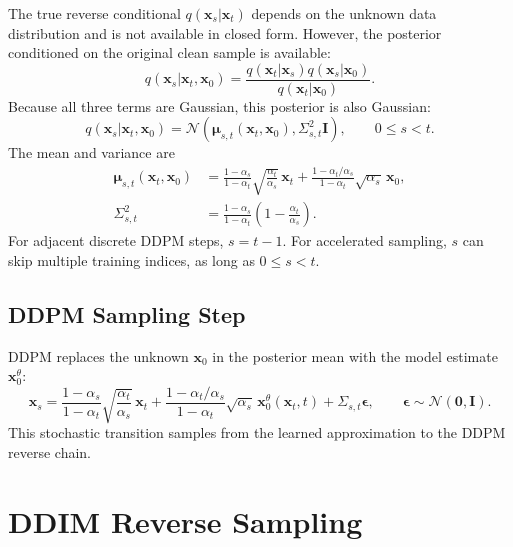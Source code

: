 \documentclass[11pt]{article}
\newcommand{\bx}{\mathbf{x}}
\newcommand{\beps}{\boldsymbol{\epsilon}}
\newcommand{\bI}{\mathbf{I}}
\newcommand{\N}{\mathcal{N}}
\begin{document}
The true reverse conditional $q(\bx_s|\bx_t)$ depends on the unknown data distribution and is not
available in closed form.  However, the posterior conditioned on the original clean sample is available:
\begin{equation}
  q(\bx_s|\bx_t,\bx_0)
  =
  \frac{q(\bx_t|\bx_s)q(\bx_s|\bx_0)}{q(\bx_t|\bx_0)}.
  \label{eq:bayes_posterior}
\end{equation}
Because all three terms are Gaussian, this posterior is also Gaussian:
\begin{equation}
  q(\bx_s|\bx_t,\bx_0)
  =
  \N\!\left(\boldsymbol{\mu}_{s,t}(\bx_t,\bx_0), \Sigma_{s,t}^2\bI\right),
  \qquad 0\leq s<t.
  \label{eq:posterior_gaussian}
\end{equation}
The mean and variance are
\begin{align}
  \boldsymbol{\mu}_{s,t}(\bx_t,\bx_0)
  &=
  \frac{1-\alpha_s}{1-\alpha_t}\sqrt{\frac{\alpha_t}{\alpha_s}}\,\bx_t
  +
  \frac{1-\alpha_t/\alpha_s}{1-\alpha_t}\sqrt{\alpha_s}\,\bx_0,
  \label{eq:posterior_mean} \\
  \Sigma_{s,t}^2
  &=
  \frac{1-\alpha_s}{1-\alpha_t}
  \left(1-\frac{\alpha_t}{\alpha_s}\right).
  \label{eq:posterior_variance}
\end{align}
For adjacent discrete DDPM steps, $s=t-1$.  For accelerated sampling, $s$ can skip multiple training
indices, as long as $0\leq s<t$.

\subsection{DDPM Sampling Step}

DDPM replaces the unknown $\bx_0$ in the posterior mean with the model estimate $\bx_0^\theta$:
\begin{equation}
  \bx_s
  =
  \frac{1-\alpha_s}{1-\alpha_t}\sqrt{\frac{\alpha_t}{\alpha_s}}\,\bx_t
  +
  \frac{1-\alpha_t/\alpha_s}{1-\alpha_t}\sqrt{\alpha_s}\,\bx_0^\theta(\bx_t,t)
  +
  \Sigma_{s,t}\beps,
  \qquad \beps \sim \N(\mathbf{0},\bI).
  \label{eq:ddpm_step}
\end{equation}
This stochastic transition samples from the learned approximation to the DDPM reverse chain.

\section{DDIM Reverse Sampling}
\end{document}
